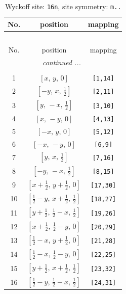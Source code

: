 \documentclass[fleqn,8pt]{jsarticle}
\begin{document}
\renewcommand{\arraystretch}{1.2}
\begin{longtable}{ccc}
\caption{Wyckoff site: {\tt 16n}, site symmetry: {\tt m..}}
 \\
 \hline \hline
No. & position & mapping \\ \hline \endfirsthead

\multicolumn{2}{l}{\tablename\ \thetable{}} \\
 \hline \hline
No. & position & mapping \\ \hline \endhead

 \hline \hline
\multicolumn{2}{r}{\footnotesize\it continued ...} \\ \endfoot

 \hline \hline
\multicolumn{2}{r}{} \\ \endlastfoot

1 & $\left[ x,\, y,\, 0 \right]$ & {\tt [1,14]} \\ \hline
2 & $\left[ - y,\, x,\, \frac{1}{2} \right]$ & {\tt [2,11]} \\ \hline
3 & $\left[ y,\, - x,\, \frac{1}{2} \right]$ & {\tt [3,10]} \\ \hline
4 & $\left[ x,\, - y,\, 0 \right]$ & {\tt [4,13]} \\ \hline
5 & $\left[ - x,\, y,\, 0 \right]$ & {\tt [5,12]} \\ \hline
6 & $\left[ - x,\, - y,\, 0 \right]$ & {\tt [6,9]} \\ \hline
7 & $\left[ y,\, x,\, \frac{1}{2} \right]$ & {\tt [7,16]} \\ \hline
8 & $\left[ - y,\, - x,\, \frac{1}{2} \right]$ & {\tt [8,15]} \\ \hline
9 & $\left[ x + \frac{1}{2},\, y + \frac{1}{2},\, 0 \right]$ & {\tt [17,30]} \\ \hline
10 & $\left[ \frac{1}{2} - y,\, x + \frac{1}{2},\, \frac{1}{2} \right]$ & {\tt [18,27]} \\ \hline
11 & $\left[ y + \frac{1}{2},\, \frac{1}{2} - x,\, \frac{1}{2} \right]$ & {\tt [19,26]} \\ \hline
12 & $\left[ x + \frac{1}{2},\, \frac{1}{2} - y,\, 0 \right]$ & {\tt [20,29]} \\ \hline
13 & $\left[ \frac{1}{2} - x,\, y + \frac{1}{2},\, 0 \right]$ & {\tt [21,28]} \\ \hline
14 & $\left[ \frac{1}{2} - x,\, \frac{1}{2} - y,\, 0 \right]$ & {\tt [22,25]} \\ \hline
15 & $\left[ y + \frac{1}{2},\, x + \frac{1}{2},\, \frac{1}{2} \right]$ & {\tt [23,32]} \\ \hline
16 & $\left[ \frac{1}{2} - y,\, \frac{1}{2} - x,\, \frac{1}{2} \right]$ & {\tt [24,31]} \\
\end{longtable}
\end{document}
